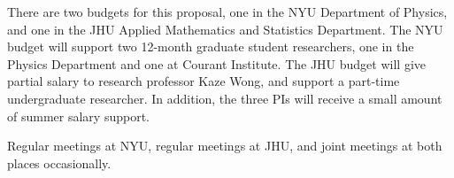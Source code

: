 \documentclass[11pt]{article}
\begin{document}
There are two budgets for this proposal, one in the NYU Department of Physics, and one in the JHU Applied Mathematics and Statistics Department.
The NYU budget will support two 12-month graduate student researchers, one in the Physics Department and one at Courant Institute.
The JHU budget will give partial salary to research professor Kaze Wong, and support a part-time undergraduate researcher.
In addition, the three PIs will receive a small amount of summer salary support.

Regular meetings at NYU, regular meetings at JHU, and joint meetings at both places occasionally.




\end{document}

